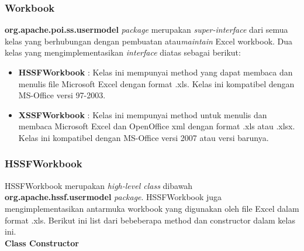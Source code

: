 \subsubsection{Workbook}
\textbf{org.apache.poi.ss.usermodel} \textit{package} merupakan \textit{super-interface} dari semua kelas yang berhubungan dengan pembuatan atau\textit{maintain} Excel workbook. Dua kelas yang mengimplementasikan \textit{interface} diatas sebagai berikut:\cite{apachepoi2}

\begin{itemize}
	\item \textbf{HSSFWorkbook} : Kelas ini mempunyai method yang dapat membaca dan menulis file Microsoft Excel dengan format .xls. Kelas ini kompatibel dengan MS-Office versi 97-2003.
	\item \textbf{XSSFWorkbook} : Kelas ini mempunyai method untuk menulis dan membaca Microsoft Excel dan OpenOffice xml dengan format .xls atau .xlsx. Kelas ini kompatibel dengan MS-Office versi 2007 atau versi barunya.
\end{itemize}  


\subsubsection{HSSFWorkbook} 
HSSFWorkbook merupakan \textit{high-level class} dibawah \textbf{org.apache.hssf.usermodel} \textit{package}. HSSFWorkbook juga mengimplementasikan antarmuka workbook yang digunakan oleh file Excel dalam format .xls. Berikut ini list dari bebeberapa method dan constructor dalam kelas ini.\cite{apachepoi2}\\

\noindent \textbf{Class Constructor}\\ \\


